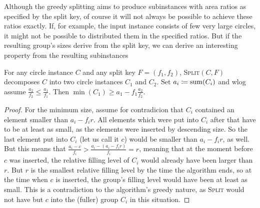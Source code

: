 \documentclass[a4paper,style=print,bibliography=totoc,nexus,lnum,extramargin]{tubsbook}
\begin{document}
Although the greedy splitting aims to produce subinstances with area ratios as specified by the split key, of course it will not always be possible to achieve these ratios exactly. If, for example, the input instance consists of few very large circles, it might not be possible to distributed them in the specified ratios.
But if the resulting group's sizes derive from the split key, we can derive an interesting property from the resulting subinstances 

\begin{lemma}\label{th:split-property}
    For any circle instance $C$ and any split key $F = (f_1, f_2)$, \textsc{Split}$(C,F)$ decomposes $C$ into two circle instances $C_1$ and $C_2$. Set $a_i \coloneqq \operatorname{sum}(C_i)$ and wlog assume $\frac{a_2}{f_2} \le \frac{a_1}{f_1}$.
    Then $\min(C_1) \ge a_1 - f_1\frac{a_2}{f_2}$.


\end{lemma}

\begin{proof}
    For the minimum size, assume for contradicion that $C_i$ contained an element smaller than $a_i - f_i r$. All elements which were put into $C_i$ after that have to be at least as small, as the elements were inserted by descending size. So the last element put into $C_i$ (let us call it $c$) would be smaller than $a_i - f_i r$, as well.
    But this means that $\frac{a_i - c}{f_i} > \frac{a_i - (a_i - f_i r)}{f_i} = r$, meaning that at the moment before $c$ was inserted, the relative filling level of $C_i$ would already have been larger than $r$. But $r$ is the smallest relative filling level by the time the algorithm ends, so at the time when $c$ is inserted, the group's filling level would have been at least as small.
    This is a contradiction to the algorithm's greedy nature, as \textsc{Split} would not have but $c$ into the (fuller) group $C_i$ in this situation.
\end{proof}
\end{document}
